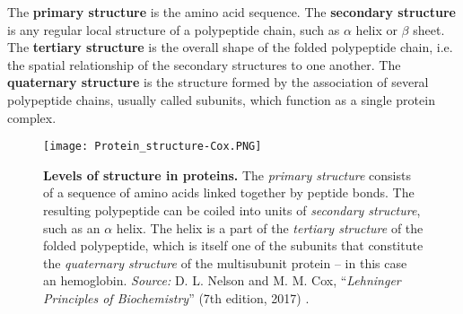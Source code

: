 The \textbf{primary structure} is the amino acid sequence. The \textbf{secondary structure} is any regular local structure of a polypeptide chain, such as $\alpha$ helix or $\beta$ sheet. 
The \textbf{tertiary structure} is the overall shape of the folded polypeptide chain, i.e. the spatial relationship of the secondary structures to one another.
The \textbf{quaternary structure} is the structure formed by the association of several polypeptide chains, usually called subunits, which function as a single protein complex.

\begin{figure}[h]
\centering
\begin{minipage}[t]{\textwidth}
\centering
\texttt{[image: Protein\_structure-Cox.PNG]}

\caption{\small{\textbf{Levels of structure in proteins.} The \textit{primary structure} consists of a sequence of amino acids linked together by peptide bonds. The resulting polypeptide can be coiled into units of \textit{secondary structure}, such as an $\alpha$ helix. The helix is a part of the \textit{tertiary structure} of the folded polypeptide, which is itself one of the subunits that constitute the \textit{quaternary structure} of the multisubunit protein -- in this case an hemoglobin.
    \textit{Source:} D. L. Nelson and M. M. Cox, ``\textit{Lehninger Principles of Biochemistry}'' (7th edition, 2017) 
    \cite{nelson2017lehninger}.}
}

\label{fig:ProteinStructure}
\end{minipage} 
\end{figure}



